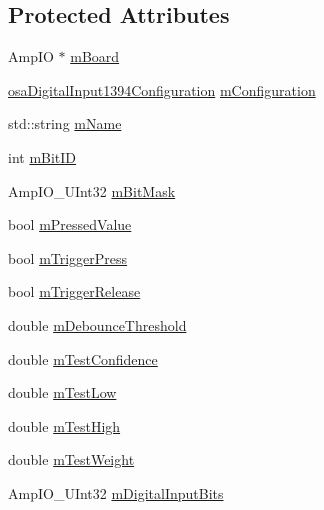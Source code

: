 \subsection*{Protected Attributes}
\begin{DoxyCompactItemize}
\item 
Amp\-I\-O $\ast$ \hyperlink{classsaw_robot_i_o1394_1_1osa_digital_input1394_a93581ba4f81ad98d30f425a25abb7dca}{m\-Board}
\item 
\hyperlink{structsaw_robot_i_o1394_1_1osa_digital_input1394_configuration}{osa\-Digital\-Input1394\-Configuration} \hyperlink{classsaw_robot_i_o1394_1_1osa_digital_input1394_a8b79a361c88f2612ccc41bbb8214b7bf}{m\-Configuration}
\item 
std\-::string \hyperlink{classsaw_robot_i_o1394_1_1osa_digital_input1394_a85c9f8c8b018618c95f3b0e2717d1142}{m\-Name}
\item 
int \hyperlink{classsaw_robot_i_o1394_1_1osa_digital_input1394_a4eddecb44399dcf72296c813bb578aff}{m\-Bit\-I\-D}
\item 
Amp\-I\-O\-\_\-\-U\-Int32 \hyperlink{classsaw_robot_i_o1394_1_1osa_digital_input1394_a18b04e419656a846e38a0461e4d90561}{m\-Bit\-Mask}
\item 
bool \hyperlink{classsaw_robot_i_o1394_1_1osa_digital_input1394_a0d90ac8bd939db2551e0452edd9a61ec}{m\-Pressed\-Value}
\item 
bool \hyperlink{classsaw_robot_i_o1394_1_1osa_digital_input1394_ac6ca087605b561e7e22b3992138f47ec}{m\-Trigger\-Press}
\item 
bool \hyperlink{classsaw_robot_i_o1394_1_1osa_digital_input1394_ae392f805d438b0d03b980146e9b53708}{m\-Trigger\-Release}
\item 
double \hyperlink{classsaw_robot_i_o1394_1_1osa_digital_input1394_a4d3524031a8e64c375d96f4487460c80}{m\-Debounce\-Threshold}
\item 
double \hyperlink{classsaw_robot_i_o1394_1_1osa_digital_input1394_a3d1da3134e7eb3d1ea21f0e8e05f4b65}{m\-Test\-Confidence}
\item 
double \hyperlink{classsaw_robot_i_o1394_1_1osa_digital_input1394_a5cef4e868073039c9c3ee66a008c5d29}{m\-Test\-Low}
\item 
double \hyperlink{classsaw_robot_i_o1394_1_1osa_digital_input1394_ae99ec5995bf80cf856267daa37f75ab7}{m\-Test\-High}
\item 
double \hyperlink{classsaw_robot_i_o1394_1_1osa_digital_input1394_a57856fc75c0a8d121020593c5a1cb069}{m\-Test\-Weight}
\item 
Amp\-I\-O\-\_\-\-U\-Int32 \hyperlink{classsaw_robot_i_o1394_1_1osa_digital_input1394_a7559d48897825942cbe87670b974bee9}{m\-Digital\-Input\-Bits}

\end{DoxyCompactItemize}
